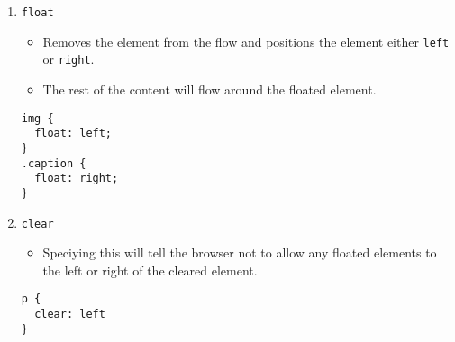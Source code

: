 \documentclass[12pt]{article}
\begin{document}
\begin{enumerate}
\item{\texttt{float}}
\begin{itemize}
    \item Removes the element from the flow and positions the element either \texttt{left} or \texttt{right}. 
    \item The rest of the content will flow around the floated element.
\end{itemize}    
\begin{lstlisting}[frame=single]
img {
  float: left;
}
.caption {
  float: right;
}
\end{lstlisting}

\item{\texttt{clear}}
\begin{itemize}
    \item Speciying this will tell the browser not to allow any floated elements to the left or right of the cleared element.
\end{itemize}    
\begin{lstlisting}[frame=single]
p {
  clear: left
}   
\end{lstlisting}
\end{enumerate}
\end{document}
